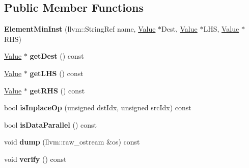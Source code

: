 \subsection*{Public Member Functions}
\begin{DoxyCompactItemize}
\item 
\mbox{\label{classglow_1_1_element_min_inst_a40bec2b87410916f04ec279211f89069}} 
{\bfseries Element\+Min\+Inst} (llvm\+::\+String\+Ref name, \hyperlink{classglow_1_1_value}{Value} $\ast$Dest, \hyperlink{classglow_1_1_value}{Value} $\ast$L\+HS, \hyperlink{classglow_1_1_value}{Value} $\ast$R\+HS)
\item 
\mbox{\label{classglow_1_1_element_min_inst_a3c359c2f09f5628f71d129c743359195}} 
\hyperlink{classglow_1_1_value}{Value} $\ast$ {\bfseries get\+Dest} () const
\item 
\mbox{\label{classglow_1_1_element_min_inst_aa6db97caa84a5f17e7abb89807e9cb13}} 
\hyperlink{classglow_1_1_value}{Value} $\ast$ {\bfseries get\+L\+HS} () const
\item 
\mbox{\label{classglow_1_1_element_min_inst_a2464d328b0653b4613d4d6a84bd57619}} 
\hyperlink{classglow_1_1_value}{Value} $\ast$ {\bfseries get\+R\+HS} () const
\item 
\mbox{\label{classglow_1_1_element_min_inst_ac0c348be810f99cbe8985e3c5f800ad0}} 
bool {\bfseries is\+Inplace\+Op} (unsigned dst\+Idx, unsigned src\+Idx) const
\item 
\mbox{\label{classglow_1_1_element_min_inst_a7a006d66a1c567dc723ed894cda4ee27}} 
bool {\bfseries is\+Data\+Parallel} () const
\item 
\mbox{\label{classglow_1_1_element_min_inst_a4aaac475132f28c06b06705308a850a6}} 
void {\bfseries dump} (llvm\+::raw\+\_\+ostream \&os) const
\item 
\mbox{\label{classglow_1_1_element_min_inst_aefe7da7366179e87e1244e71a49f935e}} 
void {\bfseries verify} () const
\end{DoxyCompactItemize}

